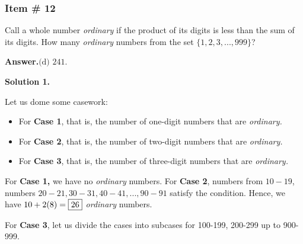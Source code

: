 \documentclass[11pt,paper=letter]{scrartcl}
\newcommand{\ans}[1]{{\sffamily \bfseries Answer.}\;\(\boxed{\text{#1}}\).}
\newcommand{\soln}[1]{{\sffamily \bfseries Solution #1.}\;}
\begin{document}
\subsubsection{Item \# 12}

\begin{probboxed}
Call a whole number \textit{ordinary} if the product of its digits is less than the sum of its digits. How many \textit{ordinary} numbers from the set $\{1,2,3,...,999\}$?

\end{probboxed}

\ans{(d) 241}

\soln1

Let us dome some casework:

\begin{itemize}
    \item For \textbf{Case 1}, that is, the number of one-digit numbers that are \textit{ordinary.}
    
     \item For \textbf{Case 2}, that is, the number of two-digit numbers that are \textit{ordinary.}
     
     \item For \textbf{Case 3}, that is, the number of three-digit numbers that are \textit{ordinary.}
\end{itemize}

For \textbf{Case 1,} we have no \textit{ordinary} numbers. For \textbf{Case 2}, numbers from $10 - 19$, numbers $20-21, 30-31, 40 - 41,..., 90-91$ satisfy the condition. Hence, we have $10 + 2(8) = \fbox{26}$ \textit{ordinary} numbers. 

For \textbf{Case 3}, let us divide the cases into subcases for 100-199, 200-299 up to 900-999. 
\end{document}
